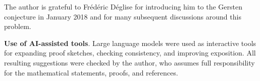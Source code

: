 \documentclass[10pt]{amsart}
\theoremstyle{remark}
\begin{document}
The author is grateful to Frédéric Déglise for introducing him to the Gersten conjecture
in January 2018 and for many subsequent discussions around this problem.


\medskip
\noindent\textbf{Use of AI-assisted tools}.
Large language models were used as interactive tools for expanding proof
sketches, checking consistency, and improving exposition.  All resulting
suggestions were checked by the author, who assumes full responsibility
for the mathematical statements, proofs, and references.






\end{document}
